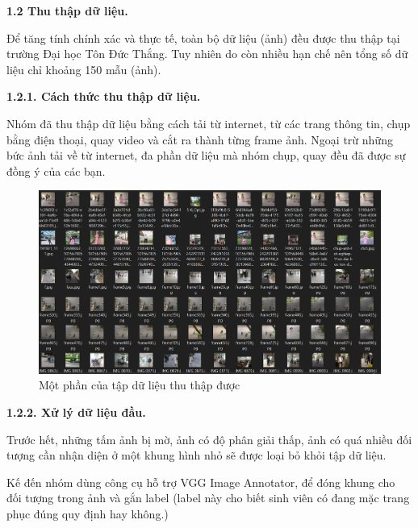 \documentclass{report}
\begin{document}
\bigskip
\changefontsizes{14pt}
\setlength{\parindent}{0.0cm}
\textbf{1.2 Thu thập dữ liệu.}


\smallskip
\changefontsizes{13pt}
\setlength{\parindent}{1cm}
Để tăng tính chính xác và thực tế, toàn bộ dữ liệu (ảnh) đều được thu thập tại trường Đại học Tôn Đức Thắng. Tuy nhiên do còn nhiều hạn chế nên tổng số dữ liệu  chỉ khoảng 150 mẫu (ảnh).

\bigskip
\changefontsizes{14pt}
\setlength{\parindent}{0.5cm}
\textbf{1.2.1. Cách thức thu thập dữ liệu.}

\changefontsizes{13pt}
\setlength{\parindent}{1cm}
\smallskip
Nhóm đã thu thập dữ liệu bằng cách tải từ internet, từ các trang thông tin, chụp bằng điện thoại, quay video và cắt ra thành từng frame ảnh. Ngoại trừ những bức ảnh tải về từ internet, đa phần dữ liệu mà nhóm chụp, quay đều đã được sự đồng ý của các bạn.

\begin{figure}[h!]
	\includegraphics[scale=0.55]{1.png}
	\caption{Một phần của tập dữ liệu thu thập được}
\end{figure}


\bigskip
\changefontsizes{14pt}
\setlength{\parindent}{0.5cm}
\textbf{1.2.2. Xử lý dữ liệu đầu.}

\smallskip
\changefontsizes{13pt}
\setlength{\parindent}{1cm}
Trước hết, những tấm ảnh bị mờ, ảnh có độ phân giải thấp, ảnh có quá nhiều đối tượng cần nhận diện ở một khung hình nhỏ sẽ được loại bỏ khỏi tập dữ liệu.

Kế đến nhóm dùng công cụ hỗ trợ VGG Image Annotator, để đóng khung cho đối tượng trong ảnh và gắn label (label này cho biết sinh viên có đang mặc trang phục đúng quy định hay không.)
\end{document}
